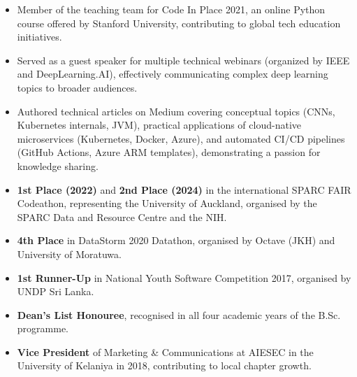 \documentclass[12pt,a4paper,withhyper]{altacv}
\begin{document}
\medskip

\begin{itemize}
    \item Member of the teaching team for Code In Place 2021, an online Python course offered by Stanford University, contributing to global tech education initiatives.
    \item Served as a guest speaker for multiple technical webinars (organized by IEEE and DeepLearning.AI), effectively communicating complex deep learning topics to broader audiences.
    \item  Authored technical articles on Medium covering conceptual topics (CNNs, Kubernetes internals, JVM), practical applications of cloud-native microservices (Kubernetes, Docker, Azure), and automated CI/CD pipelines (GitHub Actions, Azure ARM templates), demonstrating a passion for knowledge sharing.
\end{itemize}

\medskip

\begin{itemize}
    \item \textbf{1st Place (2022)} and \textbf{2nd Place (2024)} in the international SPARC FAIR Codeathon, representing the University of Auckland, organised by the SPARC Data and Resource Centre and the NIH.
    \item \textbf{4th Place} in DataStorm 2020 Datathon, organised by Octave (JKH) and University of Moratuwa.
    \item \textbf{1st Runner-Up} in National Youth Software Competition 2017, organised by UNDP Sri Lanka.
    \item \textbf{Dean’s List Honouree}, recognised in all four academic years of the B.Sc. programme.

    \item \textbf{Vice President} of Marketing \& Communications at AIESEC in the University of Kelaniya in 2018, contributing to local chapter growth.



\end{itemize}



\medskip






\end{document}
